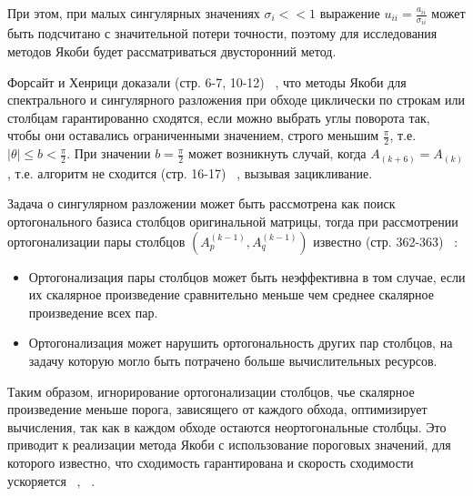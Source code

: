  При этом, при малых сингулярных значениях $\sigma_i<<1$ выражение $u_{ii} = \frac{a_{ii}}{\sigma_{ii}}$ может быть подсчитано с значительной потери точности, поэтому для исследования методов Якоби будет рассматриваться двусторонний метод.

Форсайт и Хенрици доказали (стр. 6-7, 10-12) ~\cite{Forsythe1960}, что методы Якоби для спектрального и сингулярного разложения при обходе циклически по строкам или столбцам гарантированно сходятся, если можно выбрать углы поворота так, чтобы они оставались ограниченными значением, строго меньшим $\frac{\pi}{2}$, т.е. $\left|\theta\right| \le b <\frac{\pi}{2}$. При значении $b = \frac{\pi}{2}$ может возникнуть случай, когда $A_{(k+6)}=A_{(k)}$, т.е. алгоритм не сходится (стр. 16-17) ~\cite{Forsythe1960}, вызывая зацикливание. 

Задача о сингулярном разложении может быть рассмотрена как поиск ортогонального базиса столбцов оригинальной матрицы, тогда при рассмотрении ортогонализации пары столбцов $(A^{(k-1)}_p, A^{(k-1)}_q)$ известно (стр. 362-363) ~\cite{deRijk1989}:
\begin{itemize}
    \item Ортогонализация пары столбцов может быть неэффективна в том случае, если их скалярное произведение сравнительно меньше чем среднее скалярное произведение всех пар.
    \item Ортогонализация может нарушить ортогональность других пар столбцов, на задачу которую могло быть потрачено больше вычислительных ресурсов. 
\end{itemize}
Таким образом, игнорирование ортогонализации столбцов, чье скалярное произведение меньше порога, зависящего от каждого обхода,  оптимизирует вычисления, так как в каждом обходе остаются неортогональные столбцы. Это приводит к реализации метода Якоби с использование пороговых значений, для которого известно, что сходимость гарантирована и скорость сходимости ускоряется ~\cite{Dongarra2018}, ~\cite{Forsythe1960}. 

